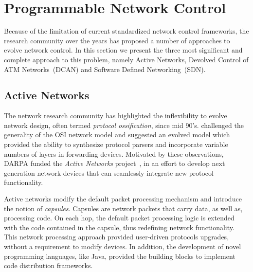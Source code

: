 \section{Programmable Network Control} \label{sec:background:prog_control}

Because of the limitation of current standardized network control frameworks,
the research community over the years has proposed a number of 
approaches to evolve network control. In this section we present the three
most significant and complete approach to this problem, namely Active Networks,
Devolved Control of ATM Networks~(DCAN) and Software Defined Networking~(SDN). 

\subsection{Active Networks}

The network research community has highlighted the inflexibility to evolve
network design, often termed \textit{protocol ossification}, since mid 90's.
\cite{O'Malley1992} challenged the generality of the OSI network model and
suggested an evolved model which provided the ability to synthesize protocol
parsers and incorporate variable numbers of layers in forwarding devices.
Motivated by these observations, DARPA funded the \emph{Active Networks}
project~\cite{darpa_active_net}, in an effort to develop next generation network
devices that can seamlessly integrate new protocol functionality. 

Active networks modify the default packet processing mechanism and introduce the
notion of \emph{capsules}. Capsules are network packets that carry data, as well
as, processing code. On each hop, the default packet processing logic is
extended with the code contained in the capsule, thus redefining network
functionality. This network processing approach provided user-driven protocols
upgrades, without a requirement to modify devices.  In addition, the development
of novel programming languages, like Java, provided the building blocks to
implement code distribution frameworks.

